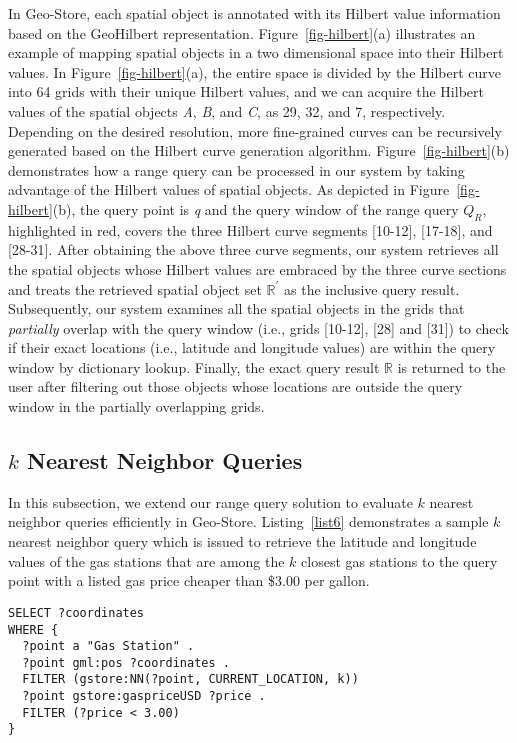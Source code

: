 In Geo-Store, each spatial object is annotated with its Hilbert
value information based on the GeoHilbert representation.
Figure~\ref{fig-hilbert}(a) illustrates an example of mapping
spatial objects in a two dimensional space into their Hilbert
values. In Figure~\ref{fig-hilbert}(a), the entire space is
divided by the Hilbert curve into 64 grids with their unique
Hilbert values, and we can acquire the Hilbert values of the
spatial objects \emph{A}, \emph{B}, and \emph{C}, as 29, 32, and
7, respectively. Depending on the desired resolution, more
fine-grained curves can be recursively generated based on the
Hilbert curve generation algorithm. Figure~\ref{fig-hilbert}(b)
demonstrates how a range query can be processed in our system by
taking advantage of the Hilbert values of spatial objects. As
depicted in Figure~\ref{fig-hilbert}(b), the query point is
\emph{q} and the query window of the range query $Q_R$,
highlighted in red, covers the three Hilbert curve segments
[10-12], [17-18], and [28-31]. After obtaining the above three
curve segments, our system retrieves all the spatial objects whose
Hilbert values are embraced by the three curve sections and treats
the retrieved spatial object set $\mathbb{R}^{\prime}$ as the
inclusive query result. Subsequently, our system examines all the
spatial objects in the grids that \emph{partially} overlap with
the query window (i.e., grids [10-12], [28] and [31]) to check if
their exact locations (i.e., latitude and longitude values) are
within the query window by dictionary lookup. Finally, the exact
query result $\mathbb{R}$ is returned to the user after filtering
out those objects whose locations are outside the query window in
the partially overlapping grids.


\subsection{$k$ Nearest Neighbor Queries}

In this subsection, we extend our range query solution to evaluate
$k$ nearest neighbor queries efficiently in Geo-Store.
Listing~\ref{list6} demonstrates a sample $k$ nearest neighbor
query which is issued to retrieve the latitude and longitude
values of the gas stations that are among the $k$ closest gas
stations to the query point with a listed gas price cheaper than
\$3.00 per gallon.



\begin{lstlisting}[caption={The sample $k$ nearest neighbor query in Geo-Store (use case 2).}, label={list6}]
SELECT ?coordinates
WHERE {
  ?point a "Gas Station" .
  ?point gml:pos ?coordinates .
  FILTER (gstore:NN(?point, CURRENT_LOCATION, k))
  ?point gstore:gaspriceUSD ?price .
  FILTER (?price < 3.00)
}
\end{lstlisting}

